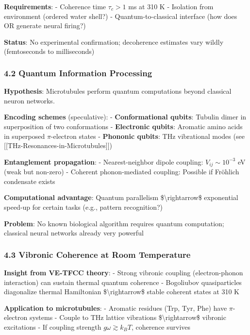 \textbf{Requirements}: - Coherence time \(\tau_c > 1\) ms at 310 K -
Isolation from environment (ordered water shell?) - Quantum-to-classical
interface (how does OR generate neural firing?)

\textbf{Status}: No experimental confirmation; decoherence estimates
vary wildly (femtoseconds to milliseconds)

\subsubsection{4.2 Quantum Information
Processing}\label{quantum-information-processing}

\textbf{Hypothesis}: Microtubules perform quantum computations beyond
classical neuron networks.

\textbf{Encoding schemes} (speculative): - \textbf{Conformational
qubits}: Tubulin dimer in superposition of two conformations -
\textbf{Electronic qubits}: Aromatic amino acids in superposed
\(\pi\)-electron states - \textbf{Phononic qubits}: THz vibrational
modes (see {[}{[}THz-Resonances-in-Microtubules{]}{]})

\textbf{Entanglement propagation}: - Nearest-neighbor dipole coupling:
\(V_{ij} \sim 10^{-3}\) eV (weak but non-zero) - Coherent
phonon-mediated coupling: Possible if Fröhlich condensate exists

\textbf{Computational advantage}: Quantum parallelism
\$\textbackslash rightarrow\$ exponential speed-up for certain tasks
(e.g., pattern recognition?)

\textbf{Problem}: No known biological algorithm requires quantum
computation; classical neural networks already very powerful

\subsubsection{4.3 Vibronic Coherence at Room
Temperature}\label{vibronic-coherence-at-room-temperature}

\textbf{Insight from VE-TFCC theory}: - Strong vibronic coupling
(electron-phonon interaction) can sustain thermal quantum coherence -
Bogoliubov quasiparticles diagonalize thermal Hamiltonian
\$\textbackslash rightarrow\$ stable coherent states at 310 K

\textbf{Application to microtubules}: - Aromatic residues (Trp, Tyr,
Phe) have \(\pi\)-electron systems - Couple to THz lattice vibrations
\$\textbackslash rightarrow\$ vibronic excitations - If coupling
strength \(g \omega \gtrsim k_B T\), coherence survives

